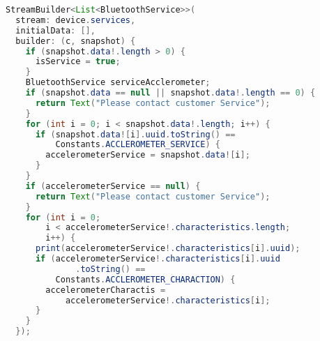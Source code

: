 \begin{lstlisting}[float,language=Java,caption={Tập lệnh để tìm kiểm dịch vụ cảm biến},label=flutterBle,captionpos=b]
StreamBuilder<List<BluetoothService>>(
  stream: device.services,
  initialData: [],
  builder: (c, snapshot) {
    if (snapshot.data!.length > 0) {
      isService = true;
    }
    BluetoothService serviceAcclerometer;
    if (snapshot.data == null || snapshot.data!.length == 0) {
      return Text("Please contact customer Service");
    }
    for (int i = 0; i < snapshot.data!.length; i++) {
      if (snapshot.data![i].uuid.toString() ==
          Constants.ACCLEROMETER_SERVICE) {
        accelerometerService = snapshot.data![i];
      }
    }
    if (accelerometerService == null) {
      return Text("Please contact customer Service");
    }
    for (int i = 0;
        i < accelerometerService!.characteristics.length;
        i++) {
      print(accelerometerService!.characteristics[i].uuid);
      if (accelerometerService!.characteristics[i].uuid
              .toString() ==
          Constants.ACCLEROMETER_CHARACTION) {
        accelerometerCharactis =
            accelerometerService!.characteristics[i];
      }
    }
  });
\end{lstlisting}
